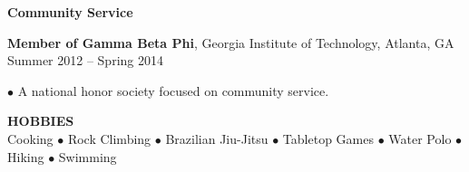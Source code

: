 \documentclass[10pt]{article}
\newenvironment{changemargin}[2]{%
  \list{}{\rightmargin#2\leftmargin#1
    \parsep=0pt\topsep=1pt\partopsep=0pt}
\item[]} {\endlist}
\newenvironment{indentmore}{\begin{changemargin}{10pt}{0cm}}{\end{changemargin}}
\begin{document}
{\bf Community Service}
\begin{indentmore}
{\bf Member of Gamma Beta Phi}, Georgia Institute of Technology, Atlanta, GA \hfill Summer 2012 -- Spring 2014
\begin{indentmore}
$\bullet$ A national honor society focused on community service. \\
\end{indentmore}
\end{indentmore}

\textbf{\large HOBBIES} \\
 Cooking $\bullet$ Rock Climbing $\bullet$ Brazilian Jiu-Jitsu $\bullet$  Tabletop Games $\bullet$ Water Polo $\bullet$ Hiking $\bullet$ Swimming
\end{document}
